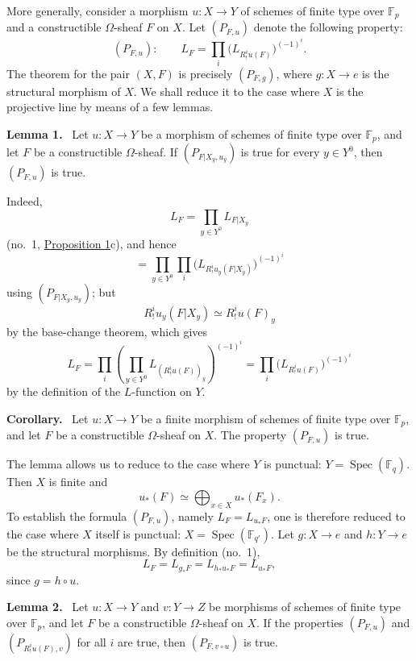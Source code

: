 \documentclass[11pt]{article}
\newenvironment{statement}[1]{\par\medskip\noindent\textbf{#1.}\ }{\par\medskip}
\DeclareMathOperator{\Spec}{Spec}
\providecommand{\Spec}{\operatorname{Spec}}
\providecommand{\Spec}{\operatorname{Spec}}
\providecommand{\Spec}{\operatorname{Spec}}
\providecommand{\Spec}{\operatorname{Spec}}
\begin{document}
More generally, consider a morphism $u:X\to Y$ of schemes of finite type over $\mathbb F_p$ and a constructible $\Omega$-sheaf $F$ on $X$. Let $(P_{F,u})$ denote the following property:
\[
(P_{F,u}):\qquad
L_F=\prod_i\bigl(L_{R^i_!u(F)}\bigr)^{(-1)^i}.
\]
The theorem for the pair $(X,F)$ is precisely $(P_{F,g})$, where $g:X\to e$ is the structural morphism of $X$. We shall reduce it to the case where $X$ is the projective line by means of a few lemmas.

\label{sga5:XV:lemma:1}\begin{statement}{Lemma 1}
Let $u:X\to Y$ be a morphism of schemes of finite type over $\mathbb F_p$, and let $F$ be a constructible $\Omega$-sheaf. If $(P_{F|X_y,u_y})$ is true for every $y\in Y^0$, then $(P_{F,u})$ is true.
\end{statement}

Indeed,
\[
L_F=\prod_{y\in Y^0}L_{F|X_y}
\]
(no.~1, \hyperref[sga5:XV:proposition:1:3]{Proposition 1}c), and hence
\[
=\prod_{y\in Y^0}\prod_i\bigl(L_{R^i_!u_y(F|X_y)}\bigr)^{(-1)^i}
\]
using $(P_{F|X_y,u_y})$; but
\[
R^i_!u_y(F|X_y)\simeq R^i_!u(F)_y
\]
by the base-change theorem, which gives
\[
L_F=\prod_i\left(\prod_{y\in Y^0}L_{(R^i_!u(F))_y}\right)^{(-1)^i}
=\prod_i\bigl(L_{R^i_!u(F)}\bigr)^{(-1)^i}
\]
by the definition of the $L$-function on $Y$.

\begin{statement}{Corollary}
Let $u:X\to Y$ be a finite morphism of schemes of finite type over $\mathbb F_p$, and let $F$ be a constructible $\Omega$-sheaf on $X$. The property $(P_{F,u})$ is true.
\end{statement}

The lemma allows us to reduce to the case where $Y$ is punctual: $Y=\Spec(\mathbb F_q)$. Then $X$ is finite and
\[
u_*(F)\simeq \bigoplus_{x\in X}u_*(F_x).
\]
To establish the formula $(P_{F,u})$, namely $L_F=L_{u_*F}$, one is therefore reduced to the case where $X$ itself is punctual: $X=\Spec(\mathbb F_{q'})$. Let $g:X\to e$ and $h:Y\to e$ be the structural morphisms. By definition (no.~1),
\[
L_F=L_{g_*F}=L_{h_*u_*F}=L_{u_*F},
\]
since $g=h\circ u$.

\label{sga5:XV:lemma:2}\begin{statement}{Lemma 2}
Let $u:X\to Y$ and $v:Y\to Z$ be morphisms of schemes of finite type over $\mathbb F_p$, and let $F$ be a constructible $\Omega$-sheaf on $X$. If the properties $(P_{F,u})$ and $(P_{R^i_!u(F),v})$ for all $i$ are true, then $(P_{F,v\circ u})$ is true.
\end{statement}
\end{document}
